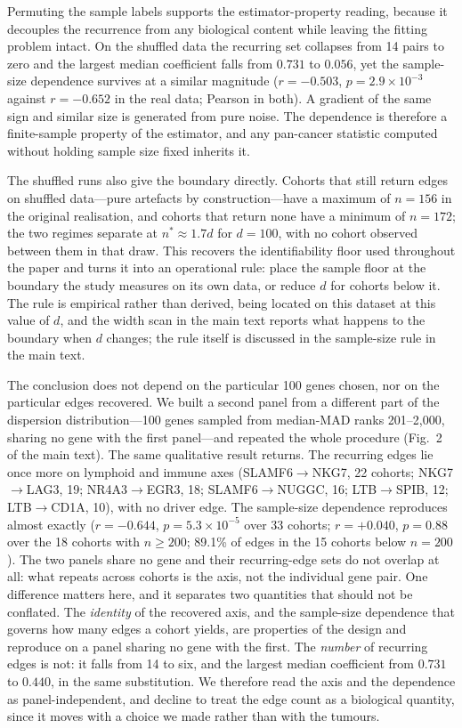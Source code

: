 \documentclass[11pt]{article}
\begin{document}
Permuting the sample labels supports the estimator-property reading, because it decouples the recurrence from any biological content while leaving the fitting problem intact. On the shuffled data the recurring set collapses from 14 pairs to zero and the largest median coefficient falls from $0.731$ to $0.056$, yet the sample-size dependence survives at a similar magnitude ($r = -0.503$, $p = 2.9 \times 10^{-3}$ against $r = -0.652$ in the real data; Pearson in both). A gradient of the same sign and similar size is generated from pure noise. The dependence is therefore a finite-sample property of the estimator, and any pan-cancer statistic computed without holding sample size fixed inherits it.

The shuffled runs also give the boundary directly. Cohorts that still return edges on shuffled data---pure artefacts by construction---have a maximum of $n = 156$ in the original realisation, and cohorts that return none have a minimum of $n = 172$; the two regimes separate at $n^{*} \approx 1.7d$ for $d = 100$, with no cohort observed
between them in that draw. This recovers the identifiability floor used throughout the paper and turns it
into an operational rule: place the sample floor at the boundary the study measures on its own
data, or reduce $d$ for cohorts below it. The rule is empirical rather than derived, being located
on this dataset at this value of $d$, and the width scan in the main text reports what happens to the
boundary when $d$ changes; the rule itself is discussed in the sample-size rule in the main text.

The conclusion does not depend on the particular 100 genes chosen, nor on the particular edges recovered. We built a second panel from a different part of the dispersion distribution---100 genes sampled from median-MAD ranks 201--2{,}000, sharing no gene with the first panel---and repeated the whole procedure (Fig.~2 of the main text). The same qualitative result returns. The recurring edges lie once more on lymphoid and immune axes (SLAMF6$\rightarrow$NKG7, 22 cohorts; NKG7$\rightarrow$LAG3, 19; NR4A3$\rightarrow$EGR3, 18; SLAMF6$\rightarrow$NUGGC, 16; LTB$\rightarrow$SPIB, 12; LTB$\rightarrow$CD1A, 10), with no driver edge. The sample-size dependence reproduces almost exactly ($r = -0.644$, $p = 5.3 \times 10^{-5}$ over 33 cohorts; $r = +0.040$, $p = 0.88$ over the 18 cohorts with $n \ge 200$; 89.1\% of edges in the 15 cohorts below $n = 200$). The two panels share no gene and their recurring-edge sets do not overlap at all: what repeats across cohorts is the axis, not the individual gene pair. One difference matters here, and it separates two quantities that should not be conflated. The
\emph{identity} of the recovered axis, and the sample-size dependence that governs how many
edges a cohort yields, are properties of the design and reproduce on a panel sharing no gene
with the first. The \emph{number} of recurring edges is not: it falls from 14 to six, and the
largest median coefficient from $0.731$ to $0.440$, in the same substitution. We therefore read
the axis and the dependence as panel-independent, and decline to treat the edge count as a
biological quantity, since it moves with a choice we made rather than with the tumours.
\end{document}
